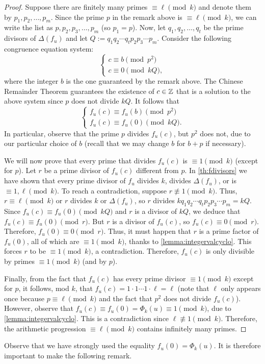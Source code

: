 \documentclass[../main.tex]{subfiles}
\begin{document}
\begin{proof}
	Suppose there are finitely many primes $\equiv \ell\pmod{k}$ and denote them by $p_1, p_2,\dots,p_m$. Since the prime $p$ in the remark above is $\equiv \ell \pmod{k}$, we can write the list as $p, p_2,p_3,\dots, \allowbreak p_m$ (so $p_1=p$). Now, let $q_1, q_2,\dots,q_t$ be the prime divisors of $\Delta(f_u)$ and let $Q:=q_1q_2\cdots q_tp_2p_3\cdots p_m$. Consider the following congruence equation system:	
	\begin{equation*}
		\begin{cases}      
			c\equiv b\pmod{p^2}\\
			c\equiv 0\pmod{kQ},
		\end{cases}
	\end{equation*}
	where the integer $b$ is the one guaranteed by the remark above. The Chinese Remainder Theorem guarantees the existence of $c\in\mathbb{Z}$ that is a solution to the above system since $p$ does not divide $kQ$. It follows that 
		\begin{equation*}
		\begin{cases}      
			f_u(c)\equiv f_u(b) \pmod{p^2}\\
			f_u(c)\equiv f_u(0) \pmod{kQ}.
		\end{cases}
	\end{equation*}
	In particular, observe that the prime $p$ divides $f_u(c)$, but $p^2$ does not, due to our particular choice of $b$ (recall that we may change $b$ for $b+p$ if necessary).
	
	We will now prove that every prime that divides $f_u(c)$ is $\equiv 1\pmod{k}$ (except for $p$). Let $r$ be a prime divisor of $f_u(c)$ different from $p$. In \cref{th:fdivisors} we have shown that every prime divisor of $f_u$ divides $k$, divides $\Delta(f_u)$, or is $\equiv1, \ell\pmod{k}$. To reach a contradiction, suppose $r\not\equiv 1\pmod{k}$. Thus, $r\equiv \ell\pmod{k}$ or $r$ divides $k$ or $\Delta(f_u)$, so $r$ divides $kq_1q_2\cdots q_tp_2p_3\cdots p_m=kQ$. Since $f_u(c)\equiv f_u(0)\pmod{kQ}$ and $r$ is a divisor of $kQ$, we deduce that $f_u(c)\equiv f_u(0)\pmod{r}$. But $r$ is a divisor of $f_u(c)$, so $f_u(c)\equiv 0 \pmod{r}$. Therefore, $f_u(0)\equiv 0\pmod{r}$. Thus, it must happen that $r$ is a prime factor of $f_u(0)$, all of which are $\equiv 1 \pmod{k}$, thanks to \cref{lemma:integervalcyclo}. This forces $r$ to be $\equiv 1 \pmod{k}$, a contradiction. Therefore, $f_u(c)$ is only divisible by primes $\equiv 1\pmod{k}$ (and by $p$).
	
	Finally, from the fact that $f_u(c)$ has every prime divisor $\equiv 1 \pmod{k}$ except for $p$, it follows, mod $k$, that $f_u(c)=1\cdot1\cdots 1\cdot\ell=\ell$ (note that $\ell$ only appears once because $p\equiv\ell\pmod{k}$ and the fact that $p^2$ does not divide $f_u(c)$). However, observe that $f_u(c)\equiv f_u(0)=\Phi_k(u)\equiv 1\pmod{k}$, due to \cref{lemma:integervalcyclo}. This is a contradiction since $\ell\not\equiv 1 \pmod{k}$. Therefore, the arithmetic progression $\equiv \ell\pmod{k}$ contains infinitely many primes.
\end{proof}
Observe that we have strongly used the equality $f_u(0)=\Phi_k(u)$. It is therefore important to make the following remark.
\end{document}
